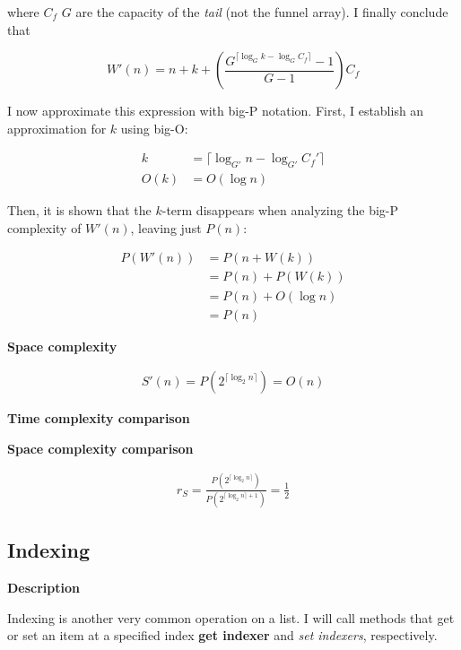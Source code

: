 \documentclass{article}
\newcommand{\descriptn}{\textbf{Description}}
\newcommand{\scomplex}{\textbf{Space complexity}}
\newcommand{\tcomplexcmp}{\textbf{Time complexity comparison}}
\newcommand{\scomplexcmp}{\textbf{Space complexity comparison}}
\newcommand{\spacefn}{S}
\newcommand{\nwritesfn}{W}
\newcommand{\spacenewfn}{\spacefn'}
\newcommand{\nwritesnewfn}{\nwritesfn'}
\newcommand{\spaceratio}{r_\spacefn}
\newcommand{\bigo}{O}
\newcommand{\biggo}{P}
\newcommand{\varnitems}{n}
\newcommand{\initcapacity}{C_f}
\newcommand{\growthfactor}{G}
\newcommand{\initcapacitynew}{\initcapacity'}
\newcommand{\growthfactornew}{\growthfactor'}
\begin{document}
	where $\initcapacity$ $\growthfactor$ are the capacity of the \textit{tail} (not the funnel array). I finally conclude that
	
	$$
	\nwritesnewfn(n) = n + k + \left( \frac{\growthfactor^{\lceil \log_{\growthfactor} k - \log_{\growthfactor} \initcapacity \rceil} - 1}{\growthfactor - 1} \right) \initcapacity
	$$
	
	I now approximate this expression with big-P notation. First, I establish an approximation for $k$ using big-O:
	
	\begin{align*}
	k &= \lceil \log_{\growthfactornew} \varnitems - \log_{\growthfactornew} \initcapacitynew \rceil\\
	\bigo(k) &= \bigo(\log \varnitems)
	\end{align*}
	
	Then, it is shown that the $k$-term disappears when analyzing the big-P complexity of $\nwritesnewfn(\varnitems)$, leaving just $\biggo(\varnitems)$:
	
	\begin{align*}
	\biggo(\nwritesnewfn(\varnitems)) &= \biggo(\varnitems + \nwritesfn(k))\\
	&= \biggo(\varnitems) + \biggo(\nwritesfn(k))\\
	&= \biggo(\varnitems) + \bigo(\log \varnitems)\\
	&= \biggo(\varnitems)
	\end{align*}
	
	\scomplex
	
	\begin{align*}
	\spacenewfn(\varnitems) = \biggo(2^{\lceil \log_2 \varnitems \rceil}) = \bigo(\varnitems)
	\end{align*}
	
	\tcomplexcmp
	
	\scomplexcmp
	
	\begin{align*}
	\spaceratio = \frac {\biggo(2^{\lceil \log_2 \varnitems \rceil})} {\biggo(2^{\lceil \log_2 \varnitems \rceil + 1})} = \frac{1}{2}
	\end{align*}
	
	\subsection{Indexing}
	
	\descriptn
	
	Indexing is another very common operation on a list. I will call methods that get or set an item at a specified index \textbf{get indexer} and \textit{set indexers}, respectively.
	
\end{document}
